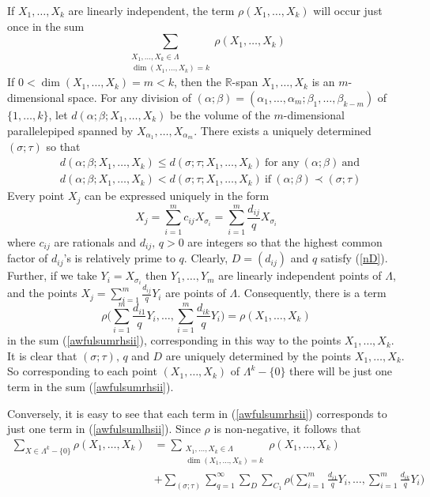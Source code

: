 \documentclass[11pt]{article}
\theoremstyle{definition}
\theoremstyle{proof}
\begin{document}
If $X_1, \ldots, X_k$ are linearly independent, the term $\rho (X_1, \ldots, X_k)$ will occur just once in the sum
\[
    \sum_{\substack{X_1, \ldots, X_k \in \Lambda  \\ \dim (X_1, \ldots, X_k) = k}} \rho (X_1, \ldots, X_k)
\]
If $0 < \dim (X_1, \ldots, X_k) = m < k$, then the $\mathbb{R}$-span $X_1, \ldots, X_k$ is an $m$-dimensional space.
For any division of $(\alpha; \beta ) = (\alpha _1, \ldots, \alpha _m; \beta _1, \ldots, \beta _{k-m})$ of $\{1, \ldots, k\}$, let $d(\alpha; \beta; X_1, \ldots, X_k)$ be the volume of the $m$-dimensional parallelepiped spanned by $X_{\alpha _1}, \ldots, X_{\alpha _m}$.
There exists a uniquely determined $(\sigma; \tau )$ so that
\begin{align*}
    & d(\alpha; \beta; X_1, \ldots, X_k) \leq d(\sigma; \tau; X_1, \ldots, X_k) \ \text{for any} \ (\alpha; \beta ) \ \text{and} \\
    & d(\alpha; \beta; X_1, \ldots, X_k) < d(\sigma; \tau; X_1, \ldots, X_k) \ \text{if} \ (\alpha; \beta ) \prec (\sigma; \tau )
\end{align*}
Every point $X_j$ can be expressed uniquely in the form
\[
    X_j = \sum_{i=1}^{m}c_{ij}X_{\sigma _i} = \sum_{i=1}^{m} \frac{d_{ij}}{q} X_{\sigma _i}
\]
where $c_{ij}$ are rationals and $d_{ij}, \, q > 0$ are integers so that the highest common factor of $d_{ij}$'s is relatively prime to $q$.
Clearly, $D=(d_{ij})$ and $q$ satisfy (\ref{nD}).
Further, if we take $Y_i = X_{\sigma _i}$ then $Y_1, \ldots, Y_m$ are linearly independent points of $\Lambda$, and the points $X_j = \sum\limits_{i=1}^{m} \frac{d_{ij}}{q} Y_i$ are points of $\Lambda$.
Consequently, there is a term
\[
    \rho \bigg(\sum_{i=1}^{m}\frac{d_{i1}}{q}Y_i, \ldots, \sum_{i=1}^{m}\frac{d_{ik}}{q}Y_i \bigg) = \rho (X_1, \ldots, X_k)
\]
in the sum (\ref{awfulsumrhsii}), corresponding in this way to the points $X_1, \ldots, X_k$.
It is clear that $(\sigma; \tau ), \, q$ and $D$ are uniquely determined by the points $X_1, \ldots, X_k$.
So corresponding to each point $(X_1, \ldots, X_k)$ of $\Lambda ^k - \{0\}$ there will be just one term in the sum (\ref{awfulsumrhsii}).

Conversely, it is easy to see that each term in (\ref{awfulsumrhsii}) corresponds to just one term in (\ref{awfulsumlhsii}).
Since $\rho$ is non-negative, it follows that
\begin{equation}\label{awfulsumii}
    \begin{split}
        \sum_{X \in \Lambda ^k - \{0\}} \rho(X_1, \ldots, X_k) &= \sum_{\substack{X_1, \ldots, X_k \in \Lambda \\ \dim (X_1, \ldots, X_k) = k}} \rho(X_1, \ldots, X_k) \\
        &+ \sum_{(\sigma ; \tau )}\sum_{q = 1}^{\infty} \sum_{D} \sum_{C_1} \rho\bigg(\sum_{i=1}^{m}\frac{d_{i1}}{q}Y_i, \ldots, \sum_{i=1}^{m}\frac{d_{ik}}{q}Y_i \bigg)
    \end{split}
\end{equation}
\end{document}
